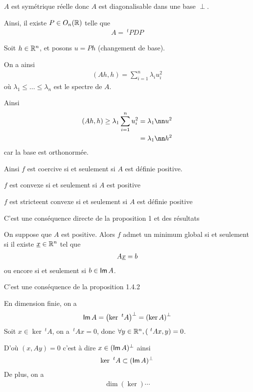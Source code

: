 \documentclass[french,a4paper,10pt]{article}
\begin{document}
	\begin{myproof}
		$A$ est symétrique réelle donc $A$ est diagonalisable dans une base $\perp$.
		
		Ainsi, il existe $P\in O_n(\mathbb{R})$ telle que
			\[\begin{aligned}
				A=~^tPDP
			\end{aligned}\]
			
		Soit $h\in\mathbb{R}^n$, et posons $u=Ph$ (changement de base).
		
		On a ainsi
		\[\begin{aligned}
			(Ah,h)=\sum_{i=1}^n\lambda_iu_i^2
		\end{aligned}\]
		où $\lambda_1\le\dots\le \lambda_n$ est le spectre de $A$.
		
		Ainsi 
			\[\begin{aligned}
				(Ah,h)\ge\lambda_1\sum_{i=1}^n u_i^2&=\lambda_1\nn u^2\\
				&=\lambda_1\nn h^2
			\end{aligned}\]
		car la base est orthonormée.
		
		Ainsi $f$ est coercive si et seulement si $A$ est définie positive.
	\end{myproof}
	
	\begin{oc-proposition}
		$f$ est convexe si et seulement si $A$ est positive
		
		$f$ est stricteent convexe si et seulement si $A$ est définie positive
	\end{oc-proposition}
	\begin{myproof}
		C'est une conséquence directe de la proposition 1 et des résultats 
	\end{myproof}
	
	\begin{oc-proposition}
		On suppose que $A$ est positive. Alors $f$ admet un minimum global si et seulement si il existe $\underline{x}\in\mathbb{R}^n$ tel que 
			\[\begin{aligned}
				A\underline{x}=b
			\end{aligned}\]
		ou encore si et seulement si $b\in\operatorname{\mathsf{Im}} A$.
	\end{oc-proposition}
	
	\begin{myproof}
		C'est une conséquence de la proposition 1.4.2
	\end{myproof}
	
	\begin{oc-remark}
		En dimension finie, on a
			\[\begin{aligned}
				\operatorname{\mathsf{Im}} A=\left(\ker~^tA\right)^\perp=\left(\ker A\right)^\perp
			\end{aligned}\]
		Soit $x\in\ker~^tA$, on a $~^tAx=0$, donc $\forall y\in\mathbb{R}^n, \left(~^tAx,y\right)=0$.
		
		D'où $(x,Ay)=0$ c'est à dire $x\in(\operatorname{\mathsf{Im}} A)^\perp$ ainsi
			\[\begin{aligned}
				\ker~^tA\subset (\operatorname{\mathsf{Im}} A)^\perp
			\end{aligned}\]
		De plus, on a
			\[\begin{aligned}
				\dim(\ker)\cdots
			\end{aligned}\]
	\end{oc-remark}
	
\end{document}
